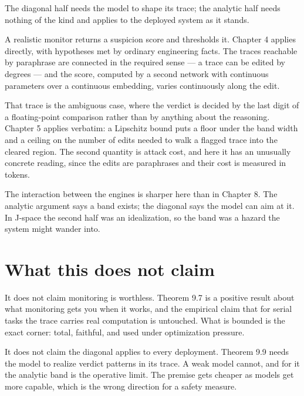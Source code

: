 \documentclass{memoir}
\begin{document}
The diagonal half needs the model to shape its trace; the analytic half needs
nothing of the kind and applies to the deployed system as it stands.

A realistic monitor returns a suspicion score and thresholds it. Chapter 4
applies directly, with hypotheses met by ordinary engineering facts. The traces
reachable by paraphrase are connected in the required sense — a trace can be
edited by degrees — and the score, computed by a second network with continuous
parameters over a continuous embedding, varies continuously along the edit.

That trace is the ambiguous case, where the verdict is decided by the last digit
of a floating-point comparison rather than by anything about the reasoning.
Chapter 5 applies verbatim: a Lipschitz bound puts a floor under the band width
and a ceiling on the number of edits needed to walk a flagged trace into the
cleared region. The second quantity is attack cost, and here it has an unusually
concrete reading, since the edits are paraphrases and their cost is measured in
tokens.

The interaction between the engines is sharper here than in Chapter 8. The
analytic argument says a band exists; the diagonal says the model can aim at it.
In J-space the second half was an idealization, so the band was a hazard the
system might wander into.



\section{What this does not claim}\label{Two--Schemas--of--Impossibility-005F-005F-005F--Machine--Checked--Limits--of--Trustworthy--Machine--Learning-005F-005F-005F--and--Why--They--Tighten--with--Capability----The--Trace--Is--Not--a--Window----What--this--does--not--claim}

It does not claim monitoring is worthless. Theorem 9.7 is a positive result
about what monitoring gets you when it works, and the empirical claim that for
serial tasks the trace carries real computation is untouched. What is bounded is
the exact corner: total, faithful, and used under optimization pressure.

It does not claim the diagonal applies to every deployment. Theorem 9.9 needs
the model to realize verdict patterns in its trace. A weak model cannot, and for
it the analytic band is the operative limit. The premise gets cheaper as models
get more capable, which is the wrong direction for a safety measure.
\end{document}
